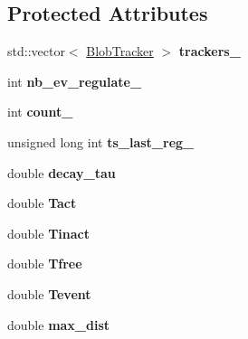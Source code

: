 \subsection*{Protected Attributes}
\begin{DoxyCompactItemize}
\item 
std\+::vector$<$ \hyperlink{classBlobTracker}{Blob\+Tracker} $>$ {\bfseries trackers\+\_\+}\hypertarget{classTrackerPool_a8a8bdb245a4e706de8f9263cc31537cd}{}\label{classTrackerPool_a8a8bdb245a4e706de8f9263cc31537cd}

\item 
int {\bfseries nb\+\_\+ev\+\_\+regulate\+\_\+}\hypertarget{classTrackerPool_af542ddb16630e451065d5e3258cd19de}{}\label{classTrackerPool_af542ddb16630e451065d5e3258cd19de}

\item 
int {\bfseries count\+\_\+}\hypertarget{classTrackerPool_a5aed0a9c9621c9fde35034a8b5f58085}{}\label{classTrackerPool_a5aed0a9c9621c9fde35034a8b5f58085}

\item 
unsigned long int {\bfseries ts\+\_\+last\+\_\+reg\+\_\+}\hypertarget{classTrackerPool_ac8ecd306ab6f0562ca2d6231ff367093}{}\label{classTrackerPool_ac8ecd306ab6f0562ca2d6231ff367093}

\item 
double {\bfseries decay\+\_\+tau}\hypertarget{classTrackerPool_abe7439ab3a403e77b56def1ae14ef1c3}{}\label{classTrackerPool_abe7439ab3a403e77b56def1ae14ef1c3}

\item 
double {\bfseries Tact}\hypertarget{classTrackerPool_aaf7de0a0903e66d7ae07cc11cb6ea072}{}\label{classTrackerPool_aaf7de0a0903e66d7ae07cc11cb6ea072}

\item 
double {\bfseries Tinact}\hypertarget{classTrackerPool_a75d2a1d3867ac839d3c24aa26241950e}{}\label{classTrackerPool_a75d2a1d3867ac839d3c24aa26241950e}

\item 
double {\bfseries Tfree}\hypertarget{classTrackerPool_ac75f2360d9bb76e0a6c79b31129c58c5}{}\label{classTrackerPool_ac75f2360d9bb76e0a6c79b31129c58c5}

\item 
double {\bfseries Tevent}\hypertarget{classTrackerPool_a3798b118a9592e75d59ad0d0e5fe438b}{}\label{classTrackerPool_a3798b118a9592e75d59ad0d0e5fe438b}

\item 
double {\bfseries max\+\_\+dist}\hypertarget{classTrackerPool_ad57d26c00d4329747f59df1b7b24ea3b}{}\label{classTrackerPool_ad57d26c00d4329747f59df1b7b24ea3b}


\end{DoxyCompactItemize}
